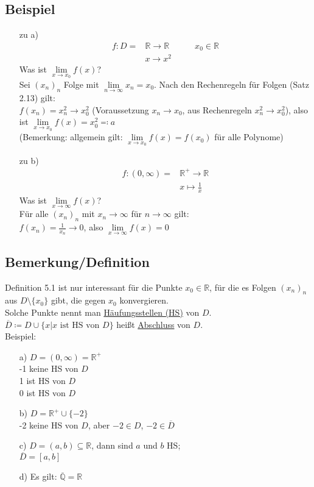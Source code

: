 \documentclass[12pt, titlepage]{article}
\newcommand{\R}{\mathds{R}}
\newcommand{\infn}{n\rightarrow\infty}
\renewcommand{\*}{\cdot}
\begin{document}
	\subsection{Beispiel}
	\begin{itemize}
		\item[zu a)] \begin{align*}
			f\colon D=&\R\rightarrow\R\qquad\quad x_0\in\R\\
			&x\rightarrow x^2
		\end{align*}
		Was ist $\lim\limits_{x\rightarrow x_0}f(x)$?\\
		Sei $(x_n)_n$ Folge mit $\lim\limits_{\infn}x_n=x_0$. Nach den Rechenregeln für Folgen (Satz 2.13) gilt:\\
		$f(x_n)=x^2_n\rightarrow x^2_0$ (Voraussetzung $x_n\rightarrow x_0$, aus Rechenregeln $x^2_n\rightarrow x^2_0$), also ist $\lim\limits_{x\rightarrow x_0}f(x)=x^2_0\eqqcolon a$\\
		(Bemerkung: allgemein gilt: $\lim\limits_{x\rightarrow x_0}f(x)=f(x_0)$ für alle Polynome)
		\item[zu b)] \begin{align*}
			f\colon (0,\infty)=&\R^+\rightarrow\R\\&x\mapsto\frac{1}{x}
		\end{align*}
		Was ist $\lim\limits_{x\rightarrow\infty}f(x)$?\\
		Für alle $(x_n)_n$ mit $x_n\rightarrow\infty$ für $\infn$ gilt:\\
		$f(x_n)=\frac{1}{x_n}\rightarrow0$, also $\lim\limits_{x\rightarrow\infty}f(x)=0$
	\end{itemize}
	\subsection{Bemerkung/Definition}
	Definition 5.1 ist nur interessant für die Punkte $x_0\in\R$, für die es Folgen $(x_n)_n$ aus $D\setminus\{x_0\}$ gibt, die gegen $x_0$ konvergieren.\\
	Solche Punkte nennt man \underline{Häufungsstellen (HS)} von $D$.\\
	$\overline{D}\coloneqq D\cup\{x|x\textrm{ ist HS von }D\}$ heißt \underline{Abschluss} von $D$.\\
	Beispiel:
	\begin{itemize}
		\item[a)] $D=(0,\infty)=\R^+$\\
		-1 keine HS von $D$\\
		1 ist HS von $D$\\
		0 ist HS von $D$
		\item[b)] $D=\R^+\cup\{-2\}$\\
		-2 keine HS von $D$, aber $-2\in D$, $-2\in\overline{D}$
		\item[c)] $D=(a,b)\subseteq\R$, dann sind $a$ und $b$ HS;\\
		$\overline{D}=[a,b]$
		\item[d)] Es gilt: $\overline{\mathds{Q}}=\R$ 
	\end{itemize}
\end{document}
